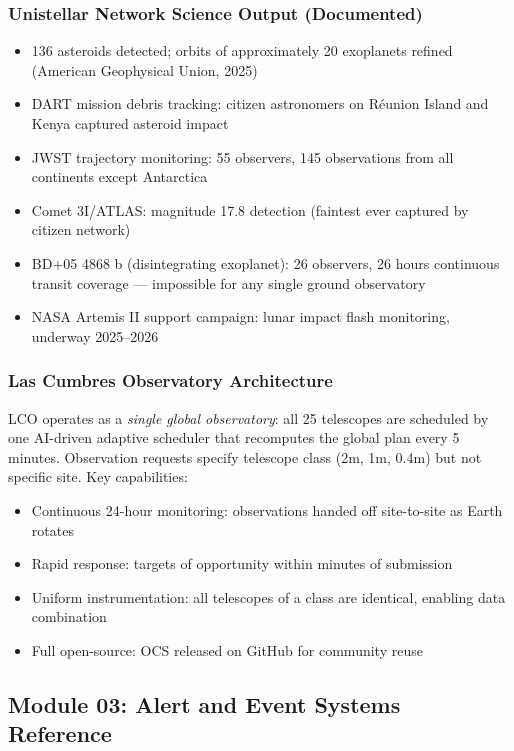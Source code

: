 \documentclass[11pt,letterpaper]{article}
\begin{document}
\subsubsection{Unistellar Network Science Output (Documented)}

\begin{itemize}
  \item 136 asteroids detected; orbits of approximately 20 exoplanets refined (American Geophysical Union, 2025)
  \item DART mission debris tracking: citizen astronomers on R\'{e}union Island and Kenya captured asteroid impact
  \item JWST trajectory monitoring: 55 observers, 145 observations from all continents except Antarctica
  \item Comet 3I/ATLAS: magnitude 17.8 detection (faintest ever captured by citizen network)
  \item BD+05 4868 b (disintegrating exoplanet): 26 observers, 26 hours continuous transit coverage --- impossible for any single ground observatory
  \item NASA Artemis II support campaign: lunar impact flash monitoring, underway 2025--2026
\end{itemize}

\subsubsection{Las Cumbres Observatory Architecture}

LCO operates as a \textit{single global observatory}: all 25 telescopes are scheduled by one AI-driven adaptive scheduler that recomputes the global plan every 5 minutes. Observation requests specify telescope class (2m, 1m, 0.4m) but not specific site. Key capabilities:
\begin{itemize}
  \item Continuous 24-hour monitoring: observations handed off site-to-site as Earth rotates
  \item Rapid response: targets of opportunity within minutes of submission
  \item Uniform instrumentation: all telescopes of a class are identical, enabling data combination
  \item Full open-source: OCS released on GitHub for community reuse
\end{itemize}

\subsection{Module 03: Alert and Event Systems Reference}
\end{document}
